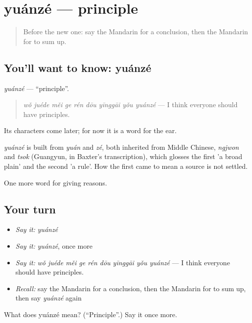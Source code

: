 \section[yuánzé]{yuánzé — principle}

\label{lesson:ZH-C371-yuanze}



\begin{quote}
Before the new one: say the Mandarin for a conclusion, then the Mandarin for to sum up.
\end{quote}

\subsection*{You'll want to know: yuánzé}
\emph{yuánzé} — \textquotedblleft{}principle\textquotedblright{}.

\begin{quote}
\emph{wǒ juéde měi ge rén dōu yīnggāi yǒu yuánzé} — I think everyone should have principles.
\end{quote}

Its characters come later; for now it is a word for the ear.

\begin{cousinweb}
\emph{yuánzé} is built from \emph{yuán} and \emph{zé}, both inherited from Middle Chinese, \emph{ngjwon} and \emph{tsok} (Guangyun, in Baxter's transcription), which glosses the first 'a broad plain' and the second 'a rule'. How the first came to mean a source is not settled.
\end{cousinweb}

\begin{grammarlens}[title={What you've built}]
One more word for giving reasons.
\end{grammarlens}

\subsection*{Your turn}
\begin{itemize}
\raggedright
  \item \emph{Say it:} \emph{yuánzé}
  \item \emph{Say it:} \emph{yuánzé}, once more
  \item \emph{Say it:} \emph{wǒ juéde měi ge rén dōu yīnggāi yǒu yuánzé} — I think everyone should have principles.
  \item \emph{Recall:} say the Mandarin for a conclusion, then the Mandarin for to sum up, then say \emph{yuánzé} again
\end{itemize}

\begin{tcolorbox}[breakable,colback=teal!4,colframe=teal!35!black,title={Before you move on}]
What does yuánzé mean? (\textquotedblleft{}Principle\textquotedblright{}.) Say it once more.
\end{tcolorbox}
